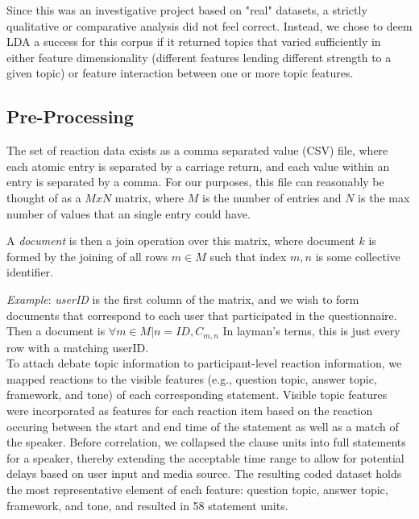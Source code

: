 Since this was an investigative project based on "real" datasets, a strictly qualitative or comparative analysis did not feel correct. Instead, we chose to deem LDA a success for this corpus if it returned topics that varied sufficiently in either feature dimensionality (different features lending different strength to a given topic) or feature interaction between one or more topic features.

\subsection{Pre-Processing}
The set of reaction data exists as a comma separated value (CSV) file, where each atomic entry is separated by a carriage return, and each value within an entry is separated by a comma. For our purposes, this file can reasonably be thought of as a $MxN$ matrix, where $M$ is the number of entries and $N$ is the max number of values that an single entry could have.

A \emph{document} is then a join operation over this matrix, where document $k$ is formed by the joining of all rows $m \in M$ such that index $m,n$ is some collective identifier.

\emph{Example}: \emph{userID} is the first column of the matrix, and we wish to form documents that correspond to each user that participated in the questionnaire. Then a document is $\forall m \in M | n = ID ,C_{m,n}$ In layman's terms, this is just every row with a matching userID.\\

To attach debate topic information to participant-level reaction information, we mapped reactions to the visible features (e.g., question topic, answer topic, framework, and tone) of each corresponding statement.  Visible topic features were incorporated as features for each reaction item based on the reaction occuring between the start and end time of the statement as well as a match of the speaker.   Before correlation,  we collapsed the clause units into full statements for a speaker, thereby extending the acceptable time range to allow for potential delays based on user input and media source.  The resulting coded dataset holds the most representative element of each feature: question topic, answer topic, framework, and tone, and resulted in 58 statement units.

